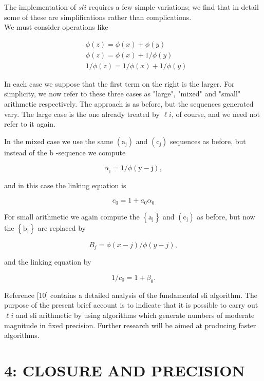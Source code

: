 \documentclass[10pt]{article}
\begin{document}
The implementation of $s l i$ requires a few simple variations; we find that in detail some of these are simplifications rather than complications.\\
We must consider operations like

$$
\begin{aligned}
& \phi(z)=\phi(x)+\phi(y) \\
& \phi(z)=\phi(x)+1 / \phi(y) \\
& 1 / \phi(z)=1 / \phi(x)+1 / \phi(y)
\end{aligned}
$$

In each case we suppose that the first term on the right is the larger. For simplicity, we now refer to these three cases as "large", "mixed" and "small" arithmetic respectively. The approach is as before, but the sequences generated vary. The large case is the one already treated by $\ell i$, of course, and we need not refer to it again.

In the mixed case we use the same $\left(\mathrm{a}_{\mathrm{j}}\right)$ and $\left(\mathrm{c}_{\mathrm{j}}\right)$ sequences as before, but instead of the b -sequence we compute

$$
\alpha_{\mathrm{j}}=1 / \phi(\mathrm{y}-\mathrm{j}),
$$

and in this case the linking equation is

$$
c_{0}=1+a_{0} \alpha_{0}
$$

For small arithmetic we again compute the $\left\{\mathrm{a}_{\mathrm{j}}\right\}$ and $\left(\mathrm{c}_{\mathrm{j}}\right)$ as before, but now the $\left\{\mathrm{b}_{\mathrm{j}}\right\}$ are replaced by

$$
B_{j}=\phi(x-j) / \phi(y-j),
$$

and the linking equation by

$$
1 / c_{0}=1+\beta_{0} .
$$

Reference [10] contains a detailed analysis of the fundamental sli algorithm. The purpose of the present brief account is to indicate that it is possible to carry out $\ell i$ and sli arithmetic by using algorithms which generate numbers of moderate magnitude in fixed precision. Further research will be aimed at producing faster algorithms.

\section*{4: CLOSURE AND PRECISION }
\end{document}
